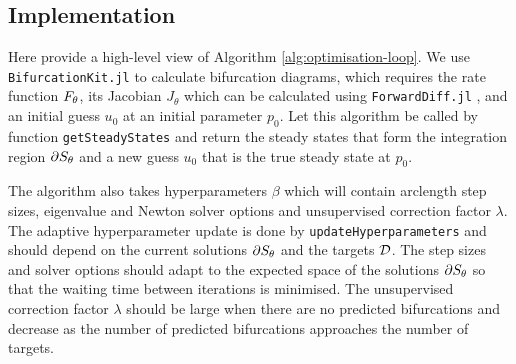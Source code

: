 

\subsection{Implementation}
\label{section:implementation}
Here provide a high-level view of Algorithm \ref{alg:optimisation-loop}. We use \texttt{BifurcationKit.jl} \cite{Veltz2019PseudoArcLengthContinuation.jl} to calculate bifurcation diagrams, which requires the rate function $F_{\theta}$, its Jacobian $J_\theta$ which can be calculated using \texttt{ForwardDiff.jl} \cite{Revels2016Forward-ModeJulia}, and an initial guess $u_0$ at an initial parameter $p_0$. Let this algorithm be called by function \texttt{getSteadyStates} and return the steady states that form the integration region $\partial S_{\theta}$ and a new guess $u_0$ that is the true steady state at $p_0$.

The algorithm also takes hyperparameters $\beta$ which will contain arclength step sizes, eigenvalue and Newton solver options and unsupervised correction factor $\lambda$. The adaptive hyperparameter update is done by \texttt{updateHyperparameters} and should depend on the current solutions $\partial S_{\theta}$ and the targets $\mathcal{D}$. The step sizes and solver options should adapt to the expected space of the solutions $\partial S_{\theta}$ so that the waiting time between iterations is minimised. The unsupervised correction factor $\lambda$ should be large when there are no predicted bifurcations and decrease as the number of predicted bifurcations approaches the number of targets.

